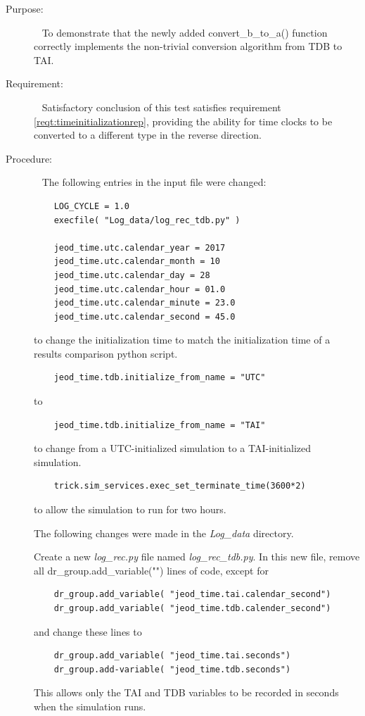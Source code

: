   \label{test:UDEinitbytdb}
\begin{description}
\item[Purpose:]\ \newline
To demonstrate that the newly added convert\_b\_to\_a() function correctly implements the
non-trivial conversion algorithm from TDB to TAI.

\item[Requirement:]\ \newline
Satisfactory conclusion of this test satisfies requirement \ref{reqt:timeinitializationrep},
providing the ability for time clocks to be converted to a different type in the reverse direction.

\item[Procedure:]\ \newline
The following entries in the input file were changed:
\begin{verbatim}
	LOG_CYCLE = 1.0
	execfile( "Log_data/log_rec_tdb.py" )

	jeod_time.utc.calendar_year = 2017
	jeod_time.utc.calendar_month = 10
	jeod_time.utc.calendar_day = 28
	jeod_time.utc.calendar_hour = 01.0
	jeod_time.utc.calendar_minute = 23.0
	jeod_time.utc.calendar_second = 45.0
\end{verbatim}
to change the initialization time to match the initialization time of a results comparison python script.
\begin{verbatim}
	jeod_time.tdb.initialize_from_name = "UTC"
\end{verbatim}
to
\begin{verbatim}
	jeod_time.tdb.initialize_from_name = "TAI"
\end{verbatim}
to change from a UTC-initialized simulation to a TAI-initialized simulation.
\begin{verbatim}
	trick.sim_services.exec_set_terminate_time(3600*2)
\end{verbatim}
to allow the simulation to run for two hours.

The following changes were made in the \textit{Log\_data} directory.

Create a new \textit{log\_rec.py} file named \textit{log\_rec\_tdb.py}. In this new file, remove all dr\_group.add\_variable("") lines of code, except for
\begin{verbatim}
	dr_group.add_variable( "jeod_time.tai.calendar_second")
	dr_group.add_variable( "jeod_time.tdb.calender_second")
\end{verbatim}
and change these lines to
\begin{verbatim}
	dr_group.add_variable( "jeod_time.tai.seconds")
	dr_group.add-variable( "jeod_time.tdb.seconds")
\end{verbatim}
This allows only the TAI and TDB variables to be recorded in seconds when the simulation runs.


\end{description}
